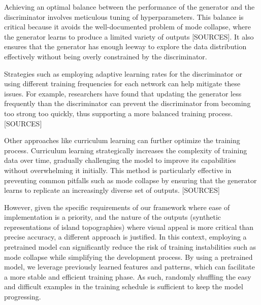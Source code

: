 Achieving an optimal balance between the performance of the generator and the discriminator involves meticulous tuning of hyperparameters. This balance is critical because it avoids the well-documented problem of mode collapse, where the generator learns to produce a limited variety of outputs [SOURCES]. It also ensures that the generator has enough leeway to explore the data distribution effectively without being overly constrained by the discriminator.

Strategies such as employing adaptive learning rates for the discriminator or using different training frequencies for each network can help mitigate these issues. For example, researchers have found that updating the generator less frequently than the discriminator can prevent the discriminator from becoming too strong too quickly, thus supporting a more balanced training process. [SOURCES]

Other approaches like curriculum learning can further optimize the training process. Curriculum learning strategically increases the complexity of training data over time, gradually challenging the model to improve its capabilities without overwhelming it initially. This method is particularly effective in preventing common pitfalls such as mode collapse by ensuring that the generator learns to replicate an increasingly diverse set of outputs. [SOURCES]

However, given the specific requirements of our framework where ease of implementation is a priority, and the nature of the outputs (synthetic representations of island topographies) where visual appeal is more critical than precise accuracy, a different approach is justified. In this context, employing a pretrained model can significantly reduce the risk of training instabilities such as mode collapse while simplifying the development process. By using a pretrained model, we leverage previously learned features and patterns, which can facilitate a more stable and efficient training phase. As such, randomly shuffling the easy and difficult examples in the training schedule is sufficient to keep the model progressing.


